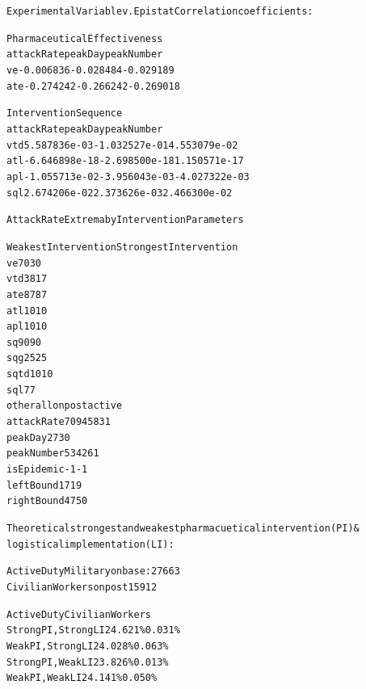 \documentclass[letterpaper,10pt,english]{/Library/Python/2.7/site-packages/sphinx/texinputs/sphinxhowto}
\newenvironment{InvisibleVerbatim}
        {\begin{mdframed}[leftmargin=0.1\linewidth,innerleftmargin=3pt,innerrightmargin=3pt, userdefinedwidth=1\linewidth, linewidth=0pt, linecolor=white, usetwoside=false]}
        {\end{mdframed}}
\begin{document}
                \begin{InvisibleVerbatim}
                \vspace{-0.5\baselineskip}
\begin{alltt}Experimental Variable v. Epistat Correlation coefficients:

Pharmaceutical Effectiveness
     attackRate   peakDay  peakNumber
ve    -0.006836 -0.028484   -0.029189
ate   -0.274242 -0.266242   -0.269018

Intervention Sequence
       attackRate       peakDay    peakNumber
vtd  5.587836e-03 -1.032527e-01  4.553079e-02
atl -6.646898e-18 -2.698500e-18  1.150571e-17
apl -1.055713e-02 -3.956043e-03 -4.027322e-03
sql  2.674206e-02  2.373626e-03  2.466300e-02


Attack Rate Extrema by Intervention Parameters

           Weakest Intervention Strongest Intervention
ve                           70                     30
vtd                          38                     17
ate                          87                     87
atl                          10                     10
apl                          10                     10
sq                           90                     90
sqg                          25                     25
sqtd                         10                     10
sql                           7                      7
other                 allonpost                 active
attackRate                 7094                   5831
peakDay                      27                     30
peakNumber                  534                    261
isEpidemic                   -1                     -1
leftBound                    17                     19
rightBound                   47                     50


Theoretical strongest and weakest pharmacuetical intervention (PI) \&
logistical implementation (LI):

Active Duty Military on base: 27663
Civilian Workers on post 15912

                Active Duty     Civilian Workers
Strong PI, Strong LI    24.621\%         0.031\%
Weak PI, Strong LI      24.028\%         0.063\%
Strong PI, Weak LI      23.826\%         0.013\%
Weak PI, Weak LI        24.141\%         0.050\%



\end{alltt}

            \end{InvisibleVerbatim}
            
\end{document}

